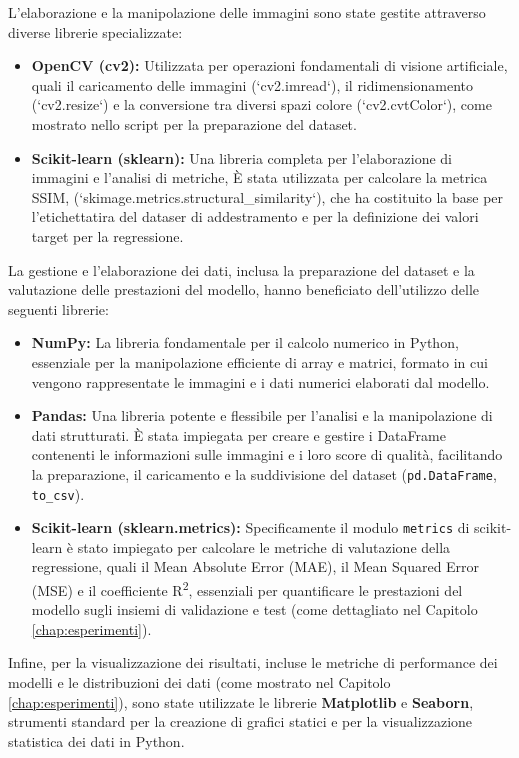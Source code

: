 L'elaborazione e la manipolazione delle immagini sono state gestite attraverso diverse librerie specializzate:
\begin{itemize}
    \item \textbf{OpenCV (cv2):} Utilizzata per operazioni fondamentali di visione artificiale, quali il caricamento delle immagini (`cv2.imread`), il ridimensionamento (`cv2.resize`) e la conversione tra diversi spazi colore (`cv2.cvtColor`), come mostrato nello script per la preparazione del dataset.
    \item \textbf{Scikit-learn (sklearn):} Una libreria completa per l'elaborazione di immagini e l'analisi di metriche, È stata utilizzata per calcolare la metrica SSIM, (`skimage.metrics.structural\_similarity`), che ha costituito la base per l'etichettatira del dataser di addestramento e per la definizione dei valori target per la regressione.
\end{itemize}

La gestione e l'elaborazione dei dati, inclusa la preparazione del dataset e la valutazione delle prestazioni del modello, hanno beneficiato dell'utilizzo delle seguenti librerie:
\begin{itemize}
    \item \textbf{NumPy:} La libreria fondamentale per il calcolo numerico in Python, essenziale per la manipolazione efficiente di array e matrici, formato in cui vengono rappresentate le immagini e i dati numerici elaborati dal modello.
    \item \textbf{Pandas:} Una libreria potente e flessibile per l'analisi e la manipolazione di dati strutturati. È stata impiegata per creare e gestire i DataFrame contenenti le informazioni sulle immagini e i loro score di qualità, facilitando la preparazione, il caricamento e la suddivisione del dataset (\texttt{pd.DataFrame}, \texttt{to\_csv}).
    \item \textbf{Scikit-learn (sklearn.metrics):} Specificamente il modulo \texttt{metrics} di scikit-learn è stato impiegato per calcolare le metriche di valutazione della regressione, quali il Mean Absolute Error (MAE), il Mean Squared Error (MSE) e il coefficiente R\textsuperscript{2}, essenziali per quantificare le prestazioni del modello sugli insiemi di validazione e test (come dettagliato nel Capitolo \ref{chap:esperimenti}).
\end{itemize}

Infine, per la visualizzazione dei risultati, incluse le metriche di performance dei modelli e le distribuzioni dei dati (come mostrato nel Capitolo \ref{chap:esperimenti}), sono state utilizzate le librerie \textbf{Matplotlib} e \textbf{Seaborn}, strumenti standard per la creazione di grafici statici e per la visualizzazione statistica dei dati in Python.

